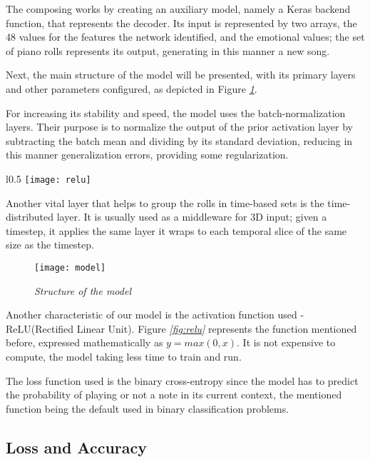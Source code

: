 The composing works by creating an auxiliary model,
namely a Keras backend function,
that represents the decoder.
Its input is represented by two arrays,
the 48 values for the features the network identified,
and the emotional values; the set of piano rolls represents its output,
generating in this manner a new song.

Next, the main structure of the model will be presented,
with its primary layers and other parameters configured, as depicted in Figure \emph{\ref{fig:model}}.


For increasing its stability and speed, the model uses the batch-normalization layers.
Their purpose is to normalize the output of the prior activation layer
by subtracting the batch mean and dividing by its standard deviation,
reducing in this manner generalization errors, providing some regularization. \cite{batchNorm}

\begin{wrapfigure}[8]{l}{0.5\textwidth}
  \centering
  \texttt{[image: relu]}
  \caption{\emph{ReLU visual representation \cite{relu}}}
  \label{fig:relu}
\end{wrapfigure}

Another vital layer that helps to group the rolls in time-based sets is the time-distributed layer.
It is usually used as a middleware for 3D input; given a timestep,
it applies the same layer it wraps to each temporal slice of the same size as the timestep.\cite{keras}


\begin{figure}[hbt!]
  \centering
  \texttt{[image: model]}
  \caption{\emph{Structure of the model}}
  \label{fig:model}
\end{figure}

\clearpage

Another characteristic of our model is the activation function used -
ReLU(Rectified Linear Unit). Figure \emph{\ref{fig:relu}} represents the function mentioned before,
expressed mathematically as $y = max(0, x)$. It is not expensive to compute,
the model taking less time to train and run. \cite{relu}

The loss function used is the binary cross-entropy since the model
has to predict the probability of playing or not a note in its current context,
the mentioned function being the default used in binary classification problems.\cite{cross}


\subsection{Loss and Accuracy}


